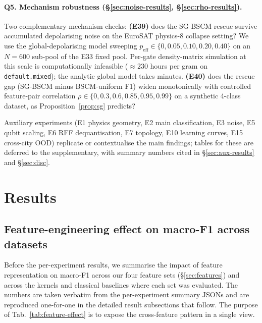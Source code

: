 \documentclass[pdflatex,sn-mathphys-num]{sn-jnl}
\theoremstyle{thmstyleone}
\theoremstyle{thmstyletwo}
\theoremstyle{thmstylethree}
\begin{document}
\paragraph{Q5. Mechanism robustness
(\S\ref{sec:noise-results}, \S\ref{sec:rho-results}).}
Two complementary mechanism checks:
\textbf{(E39)} does the SG-BSCM rescue survive accumulated
depolarising noise on the EuroSAT physics-8 collapse setting? We use
the global-depolarising model \cite{heyraud2022,schnabel2025} sweeping
$p_{\text{eff}}\in\{0,0.05,0.10,0.20,0.40\}$ on an $N=600$ sub-pool of
the E33 fixed pool. Per-gate density-matrix simulation at this scale
is computationally infeasible
($\approx 230$ hours per gram on \texttt{default.mixed}); the
analytic global model takes minutes.
\textbf{(E40)} does the rescue gap (SG-BSCM minus BSCM-uniform F1)
widen monotonically with controlled feature-pair correlation
$\rho\in\{0,0.3,0.6,0.85,0.95,0.99\}$ on a synthetic 4-class dataset,
as Proposition~\ref{prop:sg} predicts?

\noindent Auxiliary experiments (E1 physics geometry, E2 main
classification, E3 noise, E5 qubit scaling, E6 RFF dequantisation, E7
topology, E10 learning curves, E15 cross-city OOD) replicate or
contextualise the main findings; tables for these are deferred to the
supplementary, with summary numbers cited in
\S\ref{sec:aux-results} and \S\ref{sec:disc}.

\section{Results}\label{sec:results}

\subsection{Feature-engineering effect on macro-F1 across datasets}\label{sec:feature-effect}
Before the per-experiment results, we summarise the impact of feature
representation on macro-F1 across our four feature sets
(\S\ref{sec:features}) and across the kernels and classical baselines
where each set was evaluated. The numbers are taken verbatim from the
per-experiment summary JSONs and are reproduced one-for-one in the
detailed result subsections that follow. The purpose of
Tab.~\ref{tab:feature-effect} is to expose the cross-feature pattern
in a single view.
\end{document}
